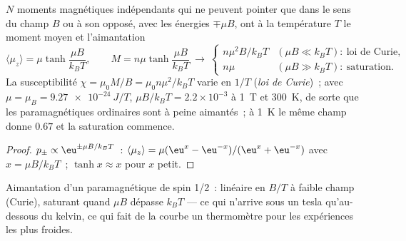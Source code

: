 \begin{proposition}\label{prop:b2:boltzmann-factor:curie}
$N$ moments magnétiques indépendants qui ne peuvent pointer que dans le sens du champ $B$
ou à son opposé, avec les énergies $\mp\mu B$, ont à la température $T$ le moment
moyen et l'aimantation
\[
\langle\mu_z\rangle = \mu\tanh\frac{\mu B}{k_BT}, \qquad
M = n\mu\tanh\frac{\mu B}{k_BT}
\ \longrightarrow\
\begin{cases} n\mu^2B/k_BT & (\mu B \ll k_BT):\ \text{loi de Curie}, \\ n\mu & (\mu B \gg k_BT):\ \text{saturation}. \end{cases}
\]
La susceptibilité $\chi = \mu_0M/B = \mu_0n\mu^2/k_BT$ varie en $1/T$
(\emph{loi de Curie}\index{loi de Curie})~; avec $\mu = \mu_B = \qty{9.27e-24}{J/T}$,
$\mu B/k_BT = 2.2 \times 10^{-3}$ à \qty{1}{T} et \qty{300}{K}, de sorte que les
paramagnétiques ordinaires sont à peine aimantés~; à \qty{1}{K} le même champ donne
$0.67$ et la saturation commence.
\end{proposition}

\begin{proof}
$p_\pm \propto\eu^{\pm\mu B/k_BT}$~: $\langle\mu_z\rangle = \mu(\eu^x - \eu^{-x})/(\eu^x +
\eu^{-x})$ avec $x = \mu B/k_BT$~; $\tanh x \approx x$ pour $x$ petit.
\end{proof}

\begin{omfigure}

{\small Aimantation d'un paramagnétique de spin 1/2~: linéaire en $B/T$ à
faible champ (Curie), saturant quand $\mu B$ dépasse $k_BT$ --- ce qui n'arrive
sous un tesla qu'au-dessous du kelvin, ce qui fait de la courbe un thermomètre
pour les expériences les plus froides.}
\end{omfigure}

